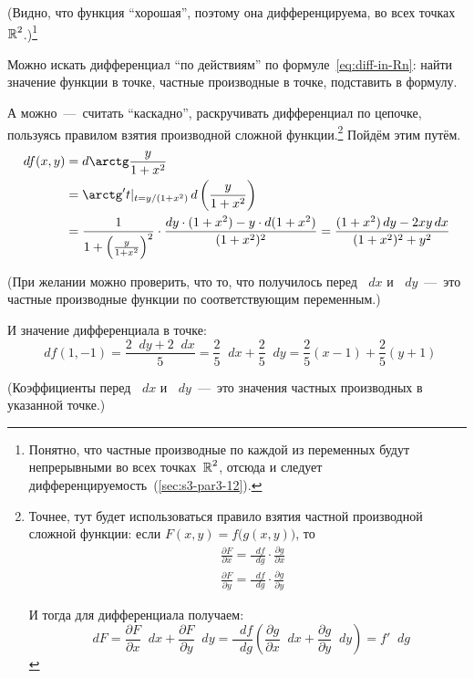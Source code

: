 \documentclass[a4paper,12pt]{article}
\newcommand{\diff}{\mathop{}\!d}
\begin{document}
  \begin{solution}
    (Видно, что функция ``хорошая'', поэтому она дифференцируема, во всех точках~$\operatorname{\mathbb R}^2$.)\footnote{
      Понятно, что частные производные по каждой из переменных будут непрерывными во всех точках~$\operatorname{\mathbb R}^2$, отсюда и следует дифференцируемость~(\ref{sec:s3-par3-12}).
    }
    
    Можно искать дифференциал ``по действиям'' по формуле~\eqref{eq:diff-in-Rn}:
    найти значение функции в точке, частные производные в точке, подставить в формулу.

    А можно~---~считать ``каскадно'', раскручивать дифференциал по цепочке, пользуясь правилом взятия производной сложной функции.\footnote{
      Точнее, тут будет использоваться правило взятия частной производной сложной функции: если $F(x, y) = f\bigl(g(x, y)\bigr)$, то
      \[
        \begin{aligned}
          &\frac{\partial F}{\partial x} = \frac{\diff f}{\diff g} \cdot \frac{\partial g}{\partial x}\\
          &\frac{\partial F}{\partial y} = \frac{\diff f}{\diff g} \cdot \frac{\partial g}{\partial y}
        \end{aligned}
      \]

      И тогда для дифференциала получаем:
      \begin{equation}\label{eq:cascade-diff}
        \diff F = \frac{\partial F}{\partial x} \diff x + \frac{\partial F}{\partial y} \diff y = \frac{\diff f}{\diff g} \left(\frac{\partial g}{\partial x} \diff x + \frac{\partial g}{\partial y} \diff y\right) = f' \diff g
      \end{equation}
    }
    Пойдём этим путём.
    \begin{equation*}
    \begin{split}
      \diff f(x, y) &= \diff \arctg \frac{y}{1 + x^2}\\
        &= \arctg' t|_{t=y/(1 + x^2)} \diff \left(\frac{y}{1 + x^2}\right)\\
        &= \frac{1}{1 + \left(\frac{y}{1 + x^2}\right)^2} \cdot \frac{\diff y \cdot (1 + x^2) - y \cdot \diff(1 + x^2)}{(1 + x^2)^2}
        = \frac{(1 + x^2) \diff y - 2xy \diff x}{(1 + x^2)^2 + y^2}
    \end{split}
    \end{equation*}

    (При желании можно проверить, что то, что получилось перед $\diff x$ и $\diff y$~---~это частные производные функции по соответствующим переменным.)

    И значение дифференциала в точке:
    \[
      \diff f(1, -1) = \frac{2\diff y + 2 \diff x}{5} = \frac{2}{5} \diff x + \frac{2}{5} \diff y = \frac{2}{5} (x - 1) + \frac{2}{5} (y + 1)
    \]

    (Коэффициенты перед $\diff x$ и $\diff y$~---~это значения частных производных в указанной точке.)
  \end{solution}
\end{document}
